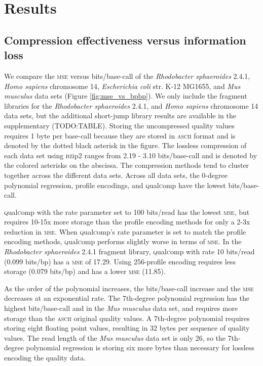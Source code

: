 \documentclass{bioinfo}
\begin{document}
\section{Results}

\subsection{Compression effectiveness versus information loss}

We compare the \textsc{mse} versus bits/base-call of the
\textit{Rhodobacter sphaeroides} 2.4.1, \textit{Homo sapiens}
chromosome 14, \textit{Escherichia coli} str. K-12 MG1655, and
\textit{Mus musculus} data sets (Figure \ref{fig:mse_vs_bpbp}). We
only include the fragment libraries for the \textit{Rhodobacter
  sphaeroides} 2.4.1, and \textit{Homo sapiens} chromosome 14 data
sets, but the additional short-jump library results are available in
the supplementary (TODO:TABLE). Storing the uncompressed quality
values requires 1 byte per base-call because they are stored in
\textsc{ascii} format and is denoted by the dotted black asterisk in
the figure. The lossless compression of each data set using \textsc{bz}ip2
ranges from 2.19 - 3.10 bits/base-call and is denoted by the colored
asterisks on the abscissa. The compression methods tend to cluster
together across the different data sets. Across all data sets, the
0-degree polynomial regression, profile encodings, and \textsc{q}ual\textsc{c}omp have
the lowest bits/base-call.

\textsc{q}ual\textsc{c}omp with the rate parameter set to 100 bits/read has the lowest
\textsc{mse}, but requires 10-15x more storage than the profile
encoding methods for only a 2-3x reduction in \textsc{mse}. When
\textsc{q}ual\textsc{c}omp's rate parameter is set to match the profile encoding
methods, \textsc{q}ual\textsc{c}omp performs slightly worse in terms of \textsc{mse}.
In the \textit{Rhodobacter sphaeroides} 2.4.1 fragment library,
\textsc{q}ual\textsc{c}omp with rate 10 bits/read (0.099 bits/bp) has a \textsc{mse} of
17.29. Using 256-profile encoding requires less storage (0.079
bits/bp) and has a lower \textsc{mse} (11.85).

As the order of the polynomial increases, the bits/base-call increase
and the \textsc{mse} decreases at an exponential rate. The 7th-degree
polynomial regression has the highest bits/base-call and in the
\textit{Mus musculus} data set, and requires more storage than the
\textsc{ascii} original quality values. A 7th-degree polynomial
requires storing eight floating point values, resulting in 32 bytes
per sequence of quality values. The read length of the \textit{Mus musculus}
data set is only 26, so the 7th-degree polynomial regression is storing
six more bytes than necessary for lossless encoding the quality data.
\end{document}
